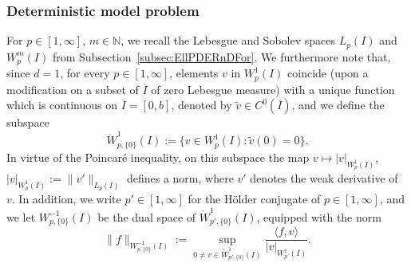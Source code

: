 \documentclass[reqno]{amsart}
\numberwithin{equation}{section}
\newcommand{\bbN}{\mathbb{N}}
\newcommand{\norm}[2]{     \| #1       \|_{ #2 }}
\newcommand{\seminorm}[2]{  | #1        |_{ #2 }}
\newcommand{\duality}[1]{     \langle #1       \rangle}
\newcommand{\Wo}{\mathring{W}}
\theoremstyle{remark}
\theoremstyle{definition}
\begin{document}
\subsubsection{Deterministic model problem} 
\label{subsubsec:rc:det-model} 

For $p\in[1,\infty]$, $m\in\bbN$, 
we recall the Lebesgue and Sobolev 
spaces $L_p(I)$ and $W^m_p(I)$ 
from Subsection~\ref{subsec:EllPDERnDFor}. 
We furthermore note that,  
since $d=1$, for every $p\in[1,\infty]$, 
elements $v$ in $W^1_p(I)$ coincide  
(upon a modification on a subset of $\overline{I}$ 
of zero Lebesgue measure) 
with a unique function which 
is continuous on $\overline{I} = [0,b]$, 
denoted by $\widetilde{v}\in C^0(\overline{I})$,  
and we define the subspace 
%
\[
\Wo_{p, \{0\} }^1(I) 
:= 
\bigl\{v\in W^1_p(I): \widetilde{v}(0) = 0 \bigr\}. 
\]
%
In virtue of the Poincar\'e inequality, 
on this subspace 
the map  
$v \mapsto \seminorm{ v }{W^1_p(I)}$,  
$\seminorm{ v }{W^1_p(I)} := \norm{ v' }{L_p(I)}$  
defines a norm,  
where $v'$ denotes the weak derivative of~$v$. 
In addition, 
we write $p'\in[1,\infty]$ for 
the H\"older conjugate of $p\in[1,\infty]$, 
and we let 
$W^{-1}_{p,\{0\}}(I)$ 
be the dual space of 
$\Wo^1_{p'\!,\{0\}}(I)$, 
equipped with the norm 
%
\[
\norm{f}{W^{-1}_{p, \{0\}}(I)} 
:= 
\sup_{0 \neq v\in \Wo^1_{p'\!,\{0\}}(I) } 
\frac{\duality{f,v}}{ \seminorm{v}{W^1_{p'}(I) } }. 
\]
\end{document}
